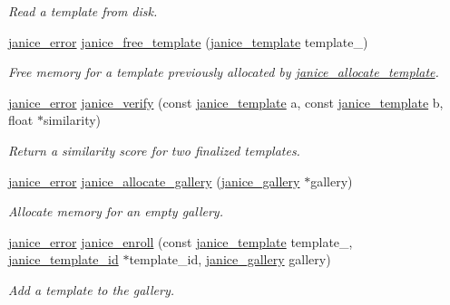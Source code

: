\begin{DoxyCompactItemize}
\begin{DoxyCompactList}\small\item\em Read a template from disk. \end{DoxyCompactList}\item 
\hyperlink{group__janice_ga4873d49c1f9d6a6880dfbd485cf6ba72}{janice\+\_\+error} \hyperlink{group__janice_ga5fa70d9ddc0b9b74e9be28cd4772be9a}{janice\+\_\+free\+\_\+template} (\hyperlink{group__janice_ga5593b06e86b90504968c0fc191ee2f3c}{janice\+\_\+template} template\+\_\+)
\begin{DoxyCompactList}\small\item\em Free memory for a template previously allocated by \hyperlink{group__janice_ga5709bc7f0fd329db20f72cac8639c328}{janice\+\_\+allocate\+\_\+template}. \end{DoxyCompactList}\item 
\hyperlink{group__janice_ga4873d49c1f9d6a6880dfbd485cf6ba72}{janice\+\_\+error} \hyperlink{group__janice_gafdbbe1f5e6346e5e84be26192e4561ac}{janice\+\_\+verify} (const \hyperlink{group__janice_ga5593b06e86b90504968c0fc191ee2f3c}{janice\+\_\+template} a, const \hyperlink{group__janice_ga5593b06e86b90504968c0fc191ee2f3c}{janice\+\_\+template} b, float $\ast$similarity)
\begin{DoxyCompactList}\small\item\em Return a similarity score for two finalized templates. \end{DoxyCompactList}\item 
\hyperlink{group__janice_ga4873d49c1f9d6a6880dfbd485cf6ba72}{janice\+\_\+error} \hyperlink{group__janice_gad17bd59e58177b5f29f32f418ce77f71}{janice\+\_\+allocate\+\_\+gallery} (\hyperlink{group__janice_ga08feff1c2835b44332afeda80c3d0fb7}{janice\+\_\+gallery} $\ast$gallery)
\begin{DoxyCompactList}\small\item\em Allocate memory for an empty gallery. \end{DoxyCompactList}\item 
\hyperlink{group__janice_ga4873d49c1f9d6a6880dfbd485cf6ba72}{janice\+\_\+error} \hyperlink{group__janice_ga5ca354538d09d4abf4bd87d34222ecd1}{janice\+\_\+enroll} (const \hyperlink{group__janice_ga5593b06e86b90504968c0fc191ee2f3c}{janice\+\_\+template} template\+\_\+, \hyperlink{group__janice_ga5ec62465fbbc7a92faadfefd3d20e25b}{janice\+\_\+template\+\_\+id} $\ast$template\+\_\+id, \hyperlink{group__janice_ga08feff1c2835b44332afeda80c3d0fb7}{janice\+\_\+gallery} gallery)
\begin{DoxyCompactList}\small\item\em Add a template to the gallery. \end{DoxyCompactList}\item 

\end{DoxyCompactItemize}
